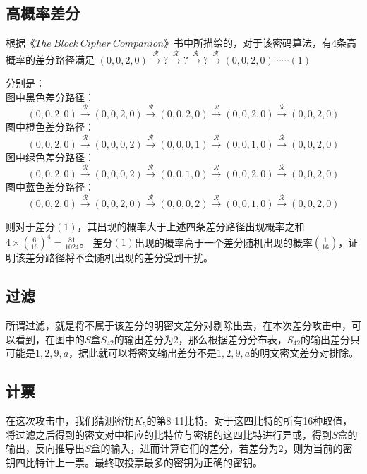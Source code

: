 \documentclass{article}
\begin{document}
\subsection*{高概率差分}
根据《$The\ Block\ Cipher\ Companion$》书中所描绘的，对于该密码算法，有4条高概率的差分路径满足
$(0,0,2,0) \stackrel {\mathscr{R}} {\longrightarrow} ? \stackrel{\mathscr{R}}{\longrightarrow} ? \stackrel{\mathscr{R}}{\longrightarrow} ?\stackrel{\mathscr{R}}{\longrightarrow}(0,0,2,0)\cdots\cdots(1)$

分别是：\\
图中黑色差分路径：
$$(0,0,2,0) \stackrel {\mathscr{R}} {\longrightarrow}  (0,0,2,0) \stackrel{\mathscr{R}}{\longrightarrow} (0,0,2,0) \stackrel{\mathscr{R}}{\longrightarrow}  (0,0,2,0) \stackrel{\mathscr{R}}{\longrightarrow} (0,0,2,0)$$
图中橙色差分路径：
$$(0,0,2,0) \stackrel {\mathscr{R}} {\longrightarrow}  (0,0,0,2) \stackrel{\mathscr{R}}{\longrightarrow}  (0,0,0,1) \stackrel{\mathscr{R}}{\longrightarrow}  (0,0,1,0) \stackrel{\mathscr{R}}{\longrightarrow}(0,0,2,0)$$
图中绿色差分路径：
$$(0,0,2,0) \stackrel {\mathscr{R}} {\longrightarrow}  (0,0,0,2) \stackrel{\mathscr{R}}{\longrightarrow}  (0,0,1,0) \stackrel{\mathscr{R}}{\longrightarrow}  (0,0,2,0) \stackrel{\mathscr{R}}{\longrightarrow}(0,0,2,0)$$
图中蓝色差分路径：
$$(0,0,2,0) \stackrel {\mathscr{R}} {\longrightarrow}  (0,0,2,0) \stackrel{\mathscr{R}}{\longrightarrow}  (0,0,0,2) \stackrel{\mathscr{R}}{\longrightarrow}  (0,0,1,0) \stackrel{\mathscr{R}}{\longrightarrow}(0,0,2,0)$$

则对于差分$(1)$，其出现的概率大于上述四条差分路径出现概率之和$4\times(\frac{6}{16})^4=\frac{81}{1024}$。
差分$(1)$出现的概率高于一个差分随机出现的概率$(\frac{1}{16})$，证明该差分路径将不会随机出现的差分受到干扰。
\subsection*{过滤}
所谓过滤，就是将不属于该差分的明密文差分对剔除出去，在本次差分攻击中，可以看到，在图中的$S$盒$S_{42}$的输出差分为$2$，那么根据差分分布表，$S_{42}$的输出差分只可能是${1,2,9,a}$，据此就可以将密文输出差分不是${1,2,9,a}$的明文密文差分对排除。
\subsection*{计票}
在这次攻击中，我们猜测密钥$K_5$的第8-11比特。对于这四比特的所有16种取值，将过滤之后得到的密文对中相应的比特位与密钥的这四比特进行异或，得到$S$盒的输出，反向推导出$S$盒的输入，进而计算它们的差分，若差分为$2$，则为当前的密钥四比特计上一票。最终取投票最多的密钥为正确的密钥。
\end{document}
